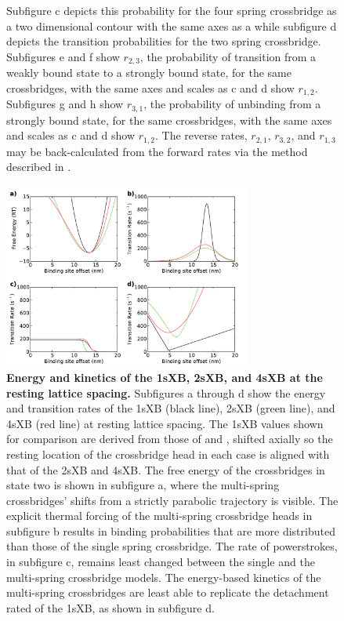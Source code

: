 \documentclass[]{article}
\begin{document}
\begin{figure}[htbp]
\begin{center}
{        Subfigure c depicts this probability for the four spring crossbridge as a two dimensional contour with the same axes as a while subfigure d depicts the transition probabilities for the two spring crossbridge.
        Subfigures e and f show $r_{2,3}$, the probability of transition from a weakly bound state to a strongly bound state, for the same crossbridges, with the same axes and scales as c and d show $r_{1,2}$.
        Subfigures g and h show $r_{3,1}$, the probability of unbinding from a strongly bound state, for the same crossbridges, with the same axes and scales as c and d show $r_{1,2}$.
        The reverse rates, $r_{2,1}$, $r_{3,2}$, and $r_{1,3}$ may be back-calculated from the forward rates via the method described in \cite{Tanner:2007:pe115}.
    }
    \end{center}
\end{figure}

\begin{figure}[htbp]
    \begin{center}
    \includegraphics[width=3.2in]{../imgs/Figure3.pdf}
    \caption{
        \label{fig_kinetics_cuts}
        \textbf{Energy and kinetics of the 1sXB, 2sXB, and 4sXB at the resting lattice spacing.}
        Subfigures a through d show the energy and transition rates of the 1sXB (black line), 2sXB (green line), and 4sXB (red line) at resting lattice spacing.
        The 1sXB values shown for comparison are derived from those of \citet{Daniel:1998:p1611} and \citet{Tanner:2007:pe115}, shifted axially so the resting location of the crossbridge head in each case is aligned with that of the 2sXB and 4sXB. 
        The free energy of the crossbridges in state two is shown in subfigure a, where the multi-spring crossbridges' shifts from a strictly parabolic trajectory is visible.
        The explicit thermal forcing of the multi-spring crossbridge heads in subfigure b results in binding probabilities that are more distributed than those of the single spring crossbridge.
        The rate of powerstrokes, in subfigure c, remains least changed between the single and the multi-spring crossbridge models.
        The energy-based kinetics of the multi-spring crossbridges are least able to replicate the detachment rated of the 1sXB, as shown in subfigure d. 
    }
    \end{center}
\end{figure}
\end{document}
